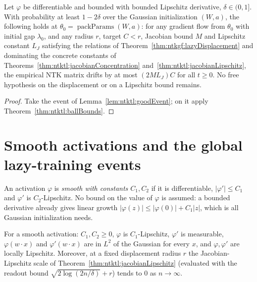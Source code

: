 \begin{theorem}\label{thm:ntktl:kernelFreezeGaussian}
  \leanok
Let $\varphi$ be differentiable and bounded with bounded Lipschitz derivative, $\delta\in(0,1]$. With probability at least $1-2\delta$ over the Gaussian initialization $(W,a)$, the following holds at $\theta_0=\operatorname{packParams}(W,a)$: for any gradient flow from $\theta_0$ with initial gap $\lambda_0$, and any radius $r$, target $C<r$, Jacobian bound $M$ and
Lipschitz constant $L_J$ satisfying the relations of Theorem~\ref{thm:ntkgf:lazyDisplacement} and dominating the concrete constants of Theorems~\ref{thm:ntktl:jacobianConcentration} and~\ref{thm:ntktl:jacobianLipschitz}, the empirical NTK matrix drifts by at most $(2ML_J)C$ for all $t\ge0$. No free hypothesis on the displacement or on a Lipschitz bound remains.
\end{theorem}

\begin{proof}
  \leanok
Take the event of Lemma~\ref{lem:ntktl:goodEvent}; on it apply Theorem~\ref{thm:ntktl:ballBounds}.
\end{proof}


\section{Smooth activations and the global lazy-training events}\label{sec:ntktl:events}

\begin{definition}\label{def:ntktl:smoothActivation}
  \leanok
An activation $\varphi$ is \emph{smooth with constants $C_1,C_2$} if it is differentiable, $|\varphi'|\le C_1$ and $\varphi'$ is $C_2$-Lipschitz. No bound on the value of $\varphi$ is assumed: a bounded derivative already gives linear growth $|\varphi(z)|\le|\varphi(0)|+C_1|z|$,
which is all Gaussian initialization needs.
\end{definition}

\begin{lemma}\label{lem:ntktl:smoothConsequences}
  \leanok
For a smooth activation: $C_1,C_2\ge0$, $\varphi$ is $C_1$-Lipschitz, $\varphi'$ is measurable, $\varphi(w\cdot x)$ and $\varphi'(w\cdot x)$ are in $L^2$ of the Gaussian for every $x$, and $\varphi,\varphi'$ are locally Lipschitz.
Moreover, at a fixed displacement radius $r$ the Jacobian-Lipschitz scale of Theorem~\ref{thm:ntktl:jacobianLipschitz} (evaluated with the readout bound $\sqrt{2\log(2n/\delta)}+r$) tends to $0$ as $n\to\infty$.
\end{lemma}

